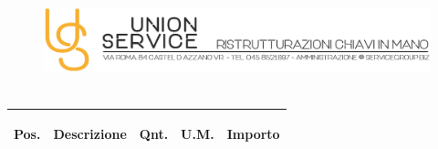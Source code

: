 \documentclass[a4paper]{article}
\begin{document}
                                 \begin{figure}[!t]
                                 \includegraphics[width=15.8cm, height=3cm]{intestazioneAlta2.jpg}
                                 \end{figure}
                                
                                  \noindent\begin{tabular}{ | L{10mm} |  L{86mm} | L{12mm} | L{12mm} | L{16mm} | }
                                  \hline
                                \vspace{2.5mm}\begin{spacing}{0}\textbf{Pos.}\end{spacing} &\vspace{2.5mm}\begin{spacing}{0}\textbf{Descrizione}\end{spacing} &\vspace{2.5mm}\begin{spacing}{0}\textbf{Qnt.}\end{spacing} &\vspace{2.5mm}\begin{spacing}{0}\textbf{U.M.}\end{spacing} &\vspace{2.5mm}\begin{spacing}{0}\textbf{Importo}
                        \end{spacing} \\ \hline %

                        \end{tabular} \\
\end{document}
